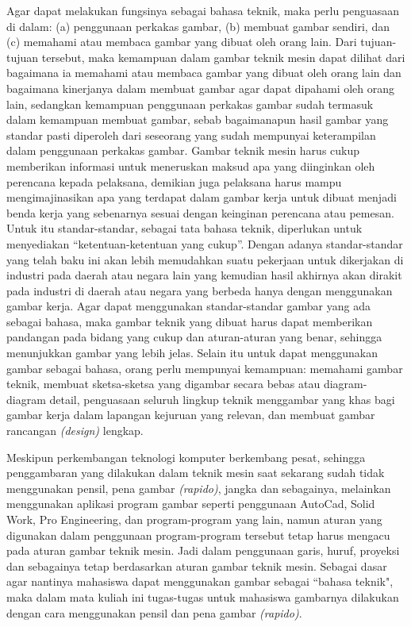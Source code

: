 \documentclass[../menggambarteknik.tex]{subfiles}
\begin{document}
Agar dapat melakukan fungsinya sebagai bahasa teknik, maka perlu penguasaan di dalam: (a) penggunaan perkakas gambar, (b) membuat gambar sendiri, dan (c) memahami atau membaca gambar yang dibuat oleh orang lain.
Dari tujuan-tujuan tersebut, maka kemampuan dalam gambar teknik mesin dapat dilihat dari bagaimana ia memahami atau membaca gambar yang dibuat oleh orang lain dan bagaimana kinerjanya dalam membuat gambar agar dapat dipahami oleh orang lain, sedangkan kemampuan penggunaan perkakas gambar sudah termasuk dalam kemampuan membuat gambar, sebab bagaimanapun hasil gambar yang standar pasti diperoleh dari seseorang yang sudah mempunyai keterampilan dalam penggunaan perkakas gambar.
Gambar teknik mesin harus cukup memberikan informasi untuk meneruskan maksud apa yang diinginkan oleh perencana kepada pelaksana, demikian juga pelaksana harus mampu mengimajinasikan apa yang terdapat dalam gambar kerja untuk dibuat menjadi benda kerja yang sebenarnya sesuai dengan keinginan perencana atau pemesan. Untuk itu standar-standar, sebagai tata bahasa teknik, diperlukan untuk menyediakan “ketentuan-ketentuan yang cukup”. Dengan adanya standar-standar yang telah baku ini akan lebih memudahkan suatu pekerjaan untuk dikerjakan di industri pada daerah atau negara lain yang kemudian hasil akhirnya akan dirakit pada industri di daerah atau negara yang berbeda hanya dengan menggunakan gambar kerja.
Agar dapat menggunakan standar-standar gambar yang ada sebagai bahasa, maka gambar teknik yang dibuat harus dapat memberikan pandangan pada bidang yang cukup dan aturan-aturan yang benar, sehingga menunjukkan gambar yang lebih jelas. Selain itu untuk dapat menggunakan gambar sebagai bahasa, orang perlu mempunyai kemampuan: memahami gambar teknik, membuat sketsa-sketsa yang digambar secara bebas atau diagram-diagram detail, penguasaan seluruh lingkup teknik menggambar yang khas bagi gambar kerja dalam lapangan kejuruan yang relevan, dan membuat gambar rancangan \textit{(design)} lengkap.

Meskipun perkembangan teknologi komputer berkembang pesat, sehingga penggambaran yang dilakukan dalam teknik mesin saat sekarang sudah tidak menggunakan pensil, pena gambar \textit{(rapido)}, jangka dan sebagainya, melainkan menggunakan aplikasi program gambar seperti penggunaan AutoCad, Solid Work, Pro Engineering, dan program-program yang lain, namun aturan yang digunakan dalam penggunaan program-program tersebut tetap harus mengacu pada aturan gambar teknik mesin. Jadi dalam penggunaan garis, huruf, proyeksi dan sebagainya tetap berdasarkan aturan gambar teknik mesin.
Sebagai dasar agar nantinya mahasiswa dapat menggunakan gambar sebagai ``bahasa teknik", maka dalam mata kuliah ini tugas-tugas untuk mahasiswa gambarnya dilakukan dengan cara menggunakan pensil dan pena gambar \textit{(rapido)}.
\end{document}
